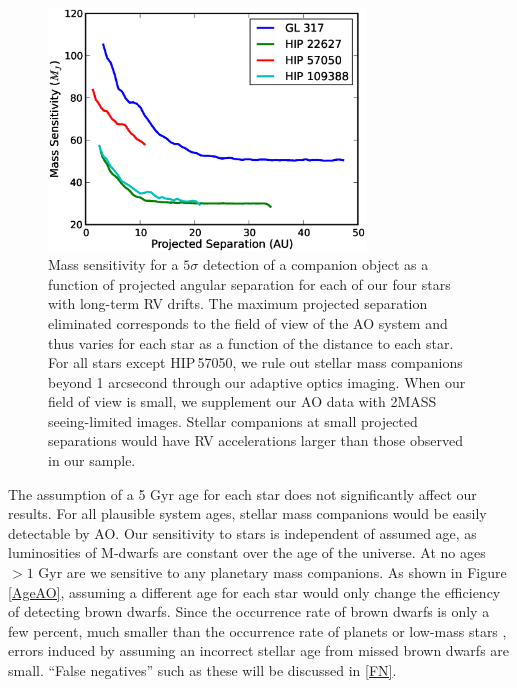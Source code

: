\begin{figure}[htbp]
\centerline{\includegraphics[width=0.75\textwidth]{chapter3/f7.eps}}
\caption[Mass sensitivity for a $5\sigma$ AO detection of a companion
as a function of projected angular separation]{Mass sensitivity for a $5\sigma$ detection of a companion object as a function of projected angular separation for each of our four stars with long-term RV drifts. The maximum projected separation eliminated corresponds to the field of view of the AO system and thus varies for each star as a function of the distance to each star. For all stars except HIP\,57050, we rule out stellar mass companions beyond 1 arcsecond through our adaptive optics imaging. When our field of view is small, we supplement our AO data with 2MASS seeing-limited images. Stellar companions at small projected separations would have RV accelerations larger than those observed in our sample. 
  }
\label{CCplot}
\end{figure}

The assumption of a 5 Gyr age for each star does not significantly affect our results. For all plausible system ages, stellar mass companions would be easily detectable by AO. Our sensitivity to stars is independent of assumed age, as luminosities of M-dwarfs are constant over the age of the universe. At no ages $> 1$ Gyr are we sensitive to any planetary mass companions. As shown in Figure \ref{AgeAO}, assuming a different age for each star would only change the efficiency of detecting brown dwarfs. Since the occurrence rate of brown dwarfs is only a few percent, much smaller than the occurrence rate of planets or low-mass stars \citep{Metchev09, Dieterich12}, errors induced by assuming an incorrect stellar age from missed brown dwarfs are small. ``False negatives'' such as these will be discussed in \textsection\ref{FN}.


